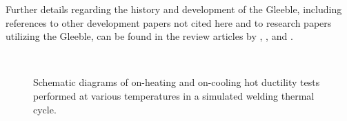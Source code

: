 Further details regarding the history and development of the Gleeble, including references to other development papers not cited here and to research papers utilizing the Gleeble, can be found in the review articles by \citet{savage_apparatus_1962}, \citet{lundin_historical_1997}, and \citet{lundin_standardization_1990_history}. 

\begin{figure}
    \centering
     \\
    \caption{Schematic diagrams of on-heating and on-cooling hot ductility tests performed at various temperatures in a simulated welding thermal cycle.}
\end{figure}

